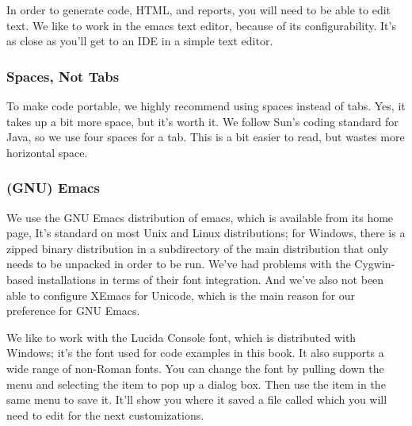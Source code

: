In order to generate code, HTML, and reports, you will need to be able
to edit text.  We like to work in the emacs text editor, because of
its configurability.  It's as close as you'll get to an IDE in a
simple text editor. 

\subsubsection{Spaces, Not Tabs}

To make code portable, we highly recommend using spaces instead of
tabs.  Yes, it takes up a bit more space, but it's worth it.  We
follow Sun's coding standard for Java, so we use four spaces for a
tab.  This is a bit easier to read, but wastes more horizontal space.

\subsubsection{(GNU) Emacs}

We use the GNU Emacs distribution of emacs, which is available from
its home page,
%
%
It's standard on most Unix and Linux distributions; for Windows, there
is a zipped binary distribution in a subdirectory of the main
distribution that only needs to be unpacked in order to be run.  We've
had problems with the Cygwin-based installations in terms of their
font integration.  And we've also not been able to configure XEmacs
for Unicode, which is the main reason for our preference for GNU Emacs.

We like to work with the Lucida Console font, which is distributed
with Windows; it's the font used for code examples in this book.  It
also supports a wide range of non-Roman fonts.  You can change the
font by pulling down the  menu and selecting the
 item to pop up a dialog box.  Then use
the  item in the same menu to save it.  It'll show
you where it saved a file called  which you will need
to edit for the next customizations.

